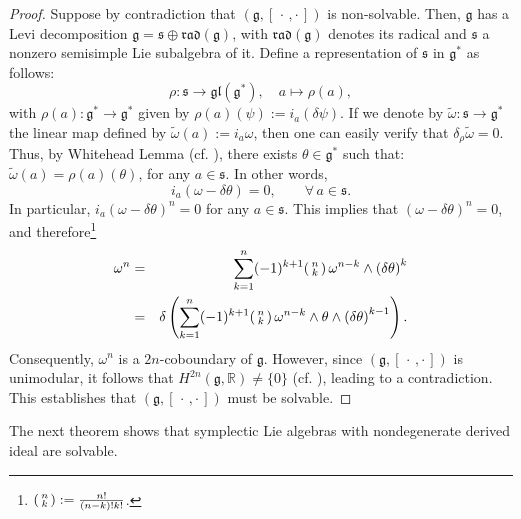 \documentclass[final,1p,times,nopreprintline]{elsarticle}
\theoremstyle{definition}
\numberwithin{equation}{section}
\newcommand{\somkn}{\displaystyle\sum_{k=1}^{n}}
\newcommand{\rel}{\mathbb{R}}
\newcommand{\w}{\omega}
\newcommand{\g}{\mathfrak{g}}
\numberwithin{equation}{section}
\newcommand{\gl}{\mathfrak{gl}}
\newcommand{\cro}{[\,\cdot\,,\cdot\,]}
\newcommand{\s}{\mathfrak{s}}
\begin{document}
\begin{proof}
	Suppose by contradiction that $(\g,[\,\cdot\,,\cdot\,])$ is non-solvable. Then, $\g$ has a Levi decomposition $\g=\mathfrak{s}\oplus\mathfrak{rad}(\g)$, with $\mathfrak{rad}(\g)$ denotes its radical and $\s$ a nonzero semisimple Lie subalgebra of it. Define a representation of $\s$ in $\g^*$ as follows:
	\begin{equation*}
		\rho:\s\to\gl(\g^*),\quad a\mapsto\rho(a),
	\end{equation*}
	with $\rho(a):\g^*\to\g^*$ given by $\rho(a)(\psi):=i_a(\delta\psi).$
	If we denote by $\widetilde{\w}:\s\to\g^*$ the linear map defined by $\widetilde{\w}(a):=i_a\w$, then one can easily verify that $\delta_\rho\widetilde{\w}=0$. Thus, by Whitehead Lemma (cf. \cite[p. $220$]{Var}), there exists $\theta\in\g^*$ such that: $\widetilde{\w}(a)=\rho(a)(\theta)$, for any $a\in\s$.
	In other words,
	\begin{equation*}
		i_a\left(\w-\delta\theta\right)=0,\qquad\forall\,a\in\s.
	\end{equation*}
	In particular, $i_a\left(\w-\delta\theta\right)^n=0$ for any $a\in\s$. This implies that $\left(\w-\delta\theta\right)^n=0$, and therefore\footnote{$\begin{psmallmatrix}
			n\\
			k
		\end{psmallmatrix}:=\tfrac{n!}{(n-k)!k!}$.}
	\begin{eqnarray*}
		\w^n&=&\somkn(-1)^{k+1}\begin{psmallmatrix}
			n\\
			k
		\end{psmallmatrix}\,\w^{n-k}\wedge\left(\delta\theta\right)^k\\
		&=&\delta\left(\somkn(-1)^{k+1}\begin{psmallmatrix}
			n\\
			k
		\end{psmallmatrix}\,\w^{n-k}\wedge\theta\wedge\left(\delta\theta\right)^{k-1}\right).
	\end{eqnarray*}
	Consequently, $\w^n$ is a $2n$-coboundary of $\g$. However, since $(\g,\cro)$ is unimodular, it follows that $H^{2n}(\g,\rel)\neq\{0\}$ (cf. \cite[p. 206]{HilNeb}), leading to a contradiction. This establishes that $(\g,[\,\cdot\,,\cdot\,])$ must be solvable.
\end{proof}

The next theorem shows that symplectic Lie algebras with nondegenerate derived ideal are solvable.
\end{document}
